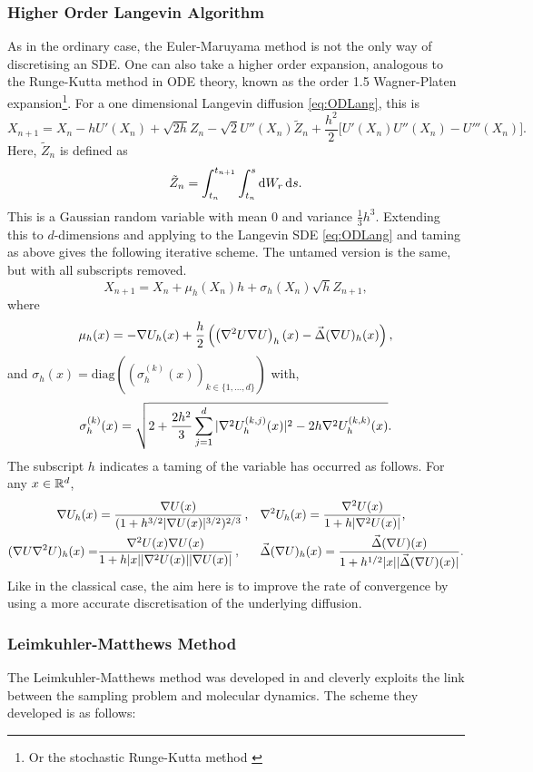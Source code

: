\subsubsection{Higher Order Langevin Algorithm}
As in the ordinary case, the Euler-Maruyama method is not the only way of discretising an SDE. One can also take a higher order expansion, analogous to the Runge-Kutta method in ODE theory, known as the order 1.5 Wagner-Platen expansion\footnote{Or the stochastic Runge-Kutta method \cite{Schaffter10numericalintegration}}. For a one dimensional Langevin diffusion \eqref{eq:ODLang}, this is 
\[X_{n+1} = X_n -hU'(X_n)+\sqrt{2h}Z_n -\sqrt{2} U''(X_n) \tilde{Z}_n +\frac{ h^2 }{2}\bigg\lbrack U'(X_n)U''(X_n)-U'''(X_n)\bigg\rbrack.  \]
Here, \(\tilde{Z}_n\) is defined as
\[  \tilde{Z}_n = \int_{t_n}^{t_{n+1}} \int_{t_n}^s \mathop{}\!\mathrm{d} W_r \mathop{}\!\mathrm{d} s. \]
This is a Gaussian random variable with mean \(0\) and variance \(\frac{1}{3}h^3 \). Extending this to \(d\)-dimensions and applying to the Langevin SDE \eqref{eq:ODLang} and taming as above gives the following iterative scheme. The untamed version is the same, but with all subscripts removed. 
\[X_{n+1} = X_n + \mu_{h}(X_n)h +\sigma_{h}(X_n)\sqrt{h}Z_{n+1},\]
where
\[\mu_{h}(x) = -\nabla U_{h}(x) +\frac{h}{2}\left( \left( \nabla^2U\nabla U\right)_{h}(x) - \vec{\Delta}(\nabla U)_{h}(x)\right) ,\]
and \(\sigma_{h}(x) = \text{diag}\left(\left( \sigma_{h}^{(k)}(x)\right)_{k\in \lbrace 1,\dots,d\rbrace}\right)\) with,
\[\sigma_{h}^{(k)}(x) = \sqrt{2+\frac{2h^2}{3}\sum_{j=1}^d |\nabla^2 U_{h}^{(k,j)}(x)|^2 - 2h \nabla^2 U_{h}^{(k,k)}(x)}.\]
The subscript \(h\) indicates a taming of the variable has occurred as follows. For any \(x\in \mathbb{R}^d\),
\begin{align*}
    \nabla U_h(x) &=\frac{\nabla U(x)}{(1+h^{3/2}|\nabla U(x)|^{3/2})^{2/3}}\, , && \nabla^2U_h(x) = \frac{\nabla^2 U(x)}{1+h|\nabla^2 U(x)|} ,\\
    (\nabla U\nabla^2U)_h(x) =&\frac{\nabla^2U(x)\nabla U(x)}{1+h|x||\nabla^2U(x)||\nabla U(x)|}\, , && \vec{\Delta}(\nabla U)_h(x) = \frac{\vec{\Delta}(\nabla U)(x)}{1+h^{1/2}|x||\vec{\Delta}(\nabla U)(x)|}.
\end{align*}
Like in the classical case, the aim here is to improve the rate of convergence by using a more accurate discretisation of the underlying diffusion.

\subsubsection{Leimkuhler-Matthews Method}
The Leimkuhler-Matthews method was developed in \cite{LM12} and cleverly exploits the link between the sampling problem and molecular dynamics. The scheme they developed is as follows:

